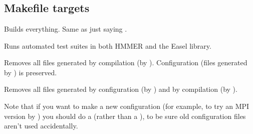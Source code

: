 \\
\\
\\


\subsection{Makefile targets}

\begin{sreitems}{}
\item[\emprog{all}]
  Builds everything. Same as just saying .

\item[\emprog{check}]
  Runs automated test suites in both HMMER and the Easel library.

\item[\emprog{clean}]
  Removes all files generated by compilation (by
  ). Configuration (files generated by
  ) is preserved.

\item[\emprog{distclean}]
Removes all files generated by configuration (by )
and by compilation (by ). 

Note that if you want to make a new configuration (for example, to try
an MPI version by ) you should
do a  (rather than a ), to be
sure old configuration files aren't used accidentally.
\end{sreitems}




